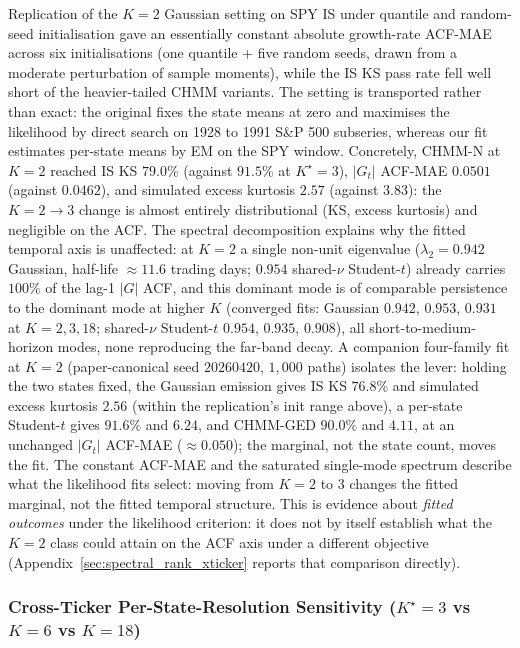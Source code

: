 Replication of the \citet{ryden1998stylized} $K = 2$ Gaussian setting on SPY IS under quantile and random-seed initialisation gave an essentially constant absolute growth-rate ACF-MAE across six initialisations (one quantile + five random seeds, drawn from a moderate perturbation of sample moments), while the IS KS pass rate fell well short of the heavier-tailed CHMM variants. The setting is transported rather than exact: the original fixes the state means at zero and maximises the likelihood by direct search on 1928 to 1991 S\&P 500 subseries, whereas our fit estimates per-state means by EM on the SPY window. Concretely, CHMM-N at $K = 2$ reached IS KS $79.0\%$ (against $91.5\%$ at $K^\star = 3$), $|G_t|$ ACF-MAE $0.0501$ (against $0.0462$), and simulated excess kurtosis $2.57$ (against $3.83$): the $K = 2 \to 3$ change is almost entirely distributional (KS, excess kurtosis) and negligible on the ACF. The spectral decomposition explains why the fitted temporal axis is unaffected: at $K = 2$ a single non-unit eigenvalue ($\lambda_2 = 0.942$ Gaussian, half-life $\approx 11.6$ trading days; $0.954$ shared-$\nu$ Student-$t$) already carries $100\%$ of the lag-1 $|G|$ ACF, and this dominant mode is of comparable persistence to the dominant mode at higher $K$ (converged fits: Gaussian $0.942$, $0.953$, $0.931$ at $K = 2, 3, 18$; shared-$\nu$ Student-$t$ $0.954$, $0.935$, $0.908$), all short-to-medium-horizon modes, none reproducing the far-band decay. A companion four-family fit at $K = 2$ (paper-canonical seed $20260420$, $1{,}000$ paths) isolates the lever: holding the two states fixed, the Gaussian emission gives IS KS $76.8\%$ and simulated excess kurtosis $2.56$ (within the replication's init range above), a per-state Student-$t$ gives $91.6\%$ and $6.24$, and CHMM-GED $90.0\%$ and $4.11$, at an unchanged $|G_t|$ ACF-MAE ($\approx 0.050$); the marginal, not the state count, moves the fit. The constant ACF-MAE and the saturated single-mode spectrum describe what the likelihood fits select: moving from $K = 2$ to $3$ changes the fitted marginal, not the fitted temporal structure. This is evidence about \emph{fitted outcomes} under the likelihood criterion: it does not by itself establish what the $K = 2$ class could attain on the ACF axis under a different objective (Appendix~\ref{sec:spectral_rank_xticker} reports that comparison directly).


\subsubsection{\texorpdfstring{Cross-Ticker Per-State-Resolution Sensitivity ($K^\star = 3$ vs $K = 6$ vs $K = 18$)}{Cross-Ticker Per-State-Resolution Sensitivity (K* = 3 vs K* = 6 vs K = 18)}}
\label{sec:cross_ticker_k6_panel}

